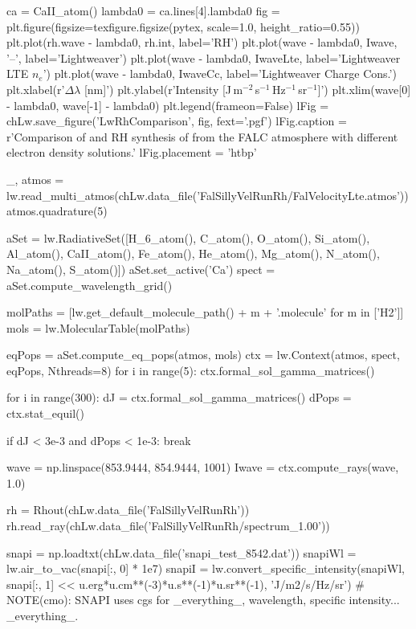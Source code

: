 \begin{pycode}[Lw]
ca = CaII_atom()
lambda0 = ca.lines[4].lambda0
fig = plt.figure(figsize=texfigure.figsize(pytex, scale=1.0, height_ratio=0.55))
plt.plot(rh.wave - lambda0, rh.int, label='RH')
plt.plot(wave - lambda0, Iwave, '--', label='Lightweaver')
plt.plot(wave - lambda0, IwaveLte, label='Lightweaver LTE $n_e$')
plt.plot(wave - lambda0, IwaveCc, label='Lightweaver Charge Cons.')
plt.xlabel(r'$\Delta\lambda$ [nm]')
plt.ylabel(r'Intensity [J\,m$^{-2}$\,s$^{-1}$\,Hz$^{-1}$\,sr$^{-1}$]')
plt.xlim(wave[0] - lambda0, wave[-1] - lambda0)
plt.legend(frameon=False)
lFig = chLw.save_figure('LwRhComparison', fig, fext='.pgf')
lFig.caption = r'Comparison of \Lw{} and RH synthesis of \CaLine{} from the FALC atmosphere with different electron density solutions.'
lFig.placement = 'htbp'
\end{pycode}
\begin{pycode}[Lw]

_, atmos = lw.read_multi_atmos(chLw.data_file('FalSillyVelRunRh/FalVelocityLte.atmos'))
atmos.quadrature(5)

aSet = lw.RadiativeSet([H_6_atom(), C_atom(), O_atom(), Si_atom(), Al_atom(),
                        CaII_atom(), Fe_atom(), He_atom(), Mg_atom(), N_atom(),
                        Na_atom(), S_atom()])
aSet.set_active('Ca')
spect = aSet.compute_wavelength_grid()

molPaths = [lw.get_default_molecule_path() + m + '.molecule' for m in ['H2']]
mols = lw.MolecularTable(molPaths)

eqPops = aSet.compute_eq_pops(atmos, mols)
ctx = lw.Context(atmos, spect, eqPops, Nthreads=8)
for i in range(5):
    ctx.formal_sol_gamma_matrices()

for i in range(300):
    dJ = ctx.formal_sol_gamma_matrices()
    dPops = ctx.stat_equil()

    if dJ < 3e-3 and dPops < 1e-3:
        break

wave = np.linspace(853.9444, 854.9444, 1001)
Iwave = ctx.compute_rays(wave, 1.0)

rh = Rhout(chLw.data_file('FalSillyVelRunRh'))
rh.read_ray(chLw.data_file('FalSillyVelRunRh/spectrum_1.00'))

snapi = np.loadtxt(chLw.data_file('snapi_test_8542.dat'))
snapiWl = lw.air_to_vac(snapi[:, 0] * 1e7)
snapiI = lw.convert_specific_intensity(snapiWl,
                                       snapi[:, 1] << u.erg*u.cm**(-3)*u.s**(-1)*u.sr**(-1),
                                       'J/m2/s/Hz/sr')
# NOTE(cmo): SNAPI uses cgs for _everything_, wavelength, specific intensity... _everything_.


\end{pycode}
